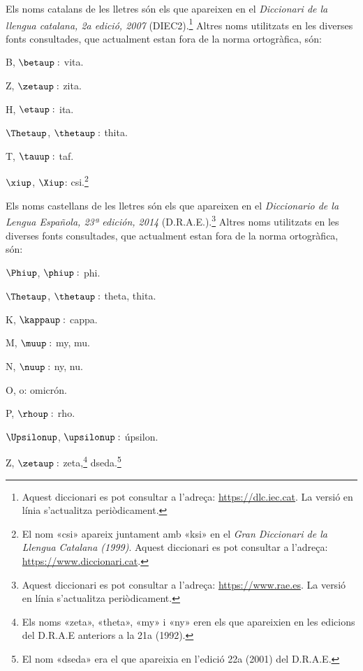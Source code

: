 Els noms catalans de les lletres són els que apareixen en el \textit{Diccionari de la llengua catalana, 2a edició, 2007} (DIEC2).\footnote{Aquest diccionari es pot consultar a l'adreça: \href{http://dlc.iec.cat/}{https:/\!\!/dlc.iec.cat}. La versió en línia s'actualitza periòdicament.} Altres noms utilitzats en
les diverses fonts consultades, que actualment estan fora de la norma ortogràfica, són:
\begin{multicols}{3}
	\begin{list}{}
		{\setlength{\labelwidth}{16mm} \setlength{\leftmargin}{16mm} \setlength{\labelsep}{2mm}}
		\item[B, $\betaup:$] vita.
		\item[Z, $\zetaup:$] zita.
		\item[H, $\etaup:$] ita.
		\item[$\Thetaup$, $\thetaup:$] thita.
		\item[T, $\tauup:$] taf.
		\item[$\xiup$, $\Xiup$:] csi.\footnote{El nom «csi» apareix juntament amb «ksi» en el \textit{Gran Diccionari de la Llengua Catalana (1999)}. Aquest diccionari es pot consultar a l'adreça:  \href{https://www.diccionari.cat/}{https:/\!\!/www.diccionari.cat}.}
	\end{list}
\end{multicols}

Els noms castellans de les lletres són els que apareixen en el \textit{Diccionario de la Lengua Española, 23ª
	edición, 2014} (D.R.A.E.).\footnote{Aquest diccionari es pot consultar a l'adreça:  \href{https://www.rae.es/}{https:/\!\!/www.rae.es}. La versió en línia s'actualitza periòdicament.} Altres noms utilitzats en les diverses fonts
consultades, que actualment estan fora de la norma ortogràfica, són:
\begin{multicols}{3}
	\begin{list}{}
		{\setlength{\labelwidth}{16mm} \setlength{\leftmargin}{16mm} \setlength{\labelsep}{2mm}}
		\item[$\Phiup$, $\phiup:$] phi.
		\item[$\Thetaup$, $\thetaup:$] theta, thita.
		\item[K, $\kappaup:$] cappa.
		\item[M, $\muup:$] my, mu.
		\item[N, $\nuup:$] ny, nu.
		\item[O, o:] omicrón.
		\item[P, $\rhoup:$] rho.
		\item[$\Upsilonup$, $\upsilonup:$] úpsilon.
		\item[Z, $\zetaup:$]  zeta,\footnote{\label{fn:zeta}Els noms «zeta», «theta», «my» i «ny» eren els que apareixien en les edicions
			del D.R.A.E anteriors a la 21a (1992).} dseda.\footnote{El nom «dseda» era el que apareixia en l'edició 22a (2001) del D.R.A.E.}
	\end{list}
\end{multicols}

